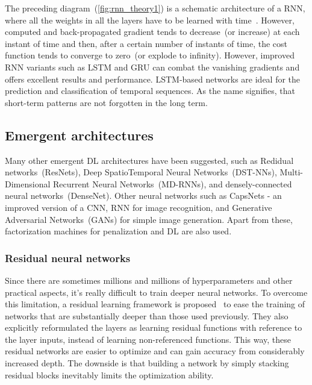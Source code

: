 \hspace*{3.5mm} The preceding diagram~(\cref{fig:rnn_theory1}) is a schematic architecture of a RNN, where all the weights in all the layers have to be learned with time~\cite{karimDLTF2018}. However, computed and back-propagated gradient tends to decrease~(or increase) at each instant of time and then, after a certain number of instants of time, the cost function tends to converge to zero~(or explode to infinity). However, improved RNN variants such as LSTM and GRU can combat the vanishing gradients and offers excellent results and performance. LSTM-based networks are ideal for the prediction and classification of temporal sequences. As the name signifies, that short-term patterns are not forgotten in the long term. 

\subsection{Emergent architectures}
Many other emergent DL architectures have been suggested, such as Redidual networks~(ResNets), Deep SpatioTemporal Neural Networks~(DST-NNs), Multi-Dimensional Recurrent Neural Networks~(MD-RNNs), and densely-connected neural networks~(DenseNet). Other neural networks such as CapsNets - an improved version of a CNN, RNN for image recognition, and Generative Adversarial Networks~(GANs) for simple image generation. Apart from these, factorization machines for penalization and DL are also used. 

\iffalse
\subsubsection{Residual neural networks}
Since there are sometimes millions and millions of hyperparameters and other practical aspects, it's really difficult to train deeper neural networks. To overcome this limitation, a residual learning framework is proposed~\cite{zagoruyko2016wide} to ease the training of networks that are substantially deeper than those used previously. They also explicitly reformulated the layers as learning residual functions with reference to the layer inputs, instead of learning non-referenced functions. This way, these residual networks are easier to optimize and can gain accuracy from considerably increased depth. The downside is that building a network by simply stacking residual blocks inevitably limits the optimization ability. %


